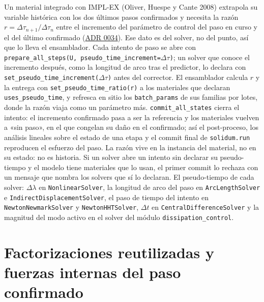 \documentclass[11pt,oneside]{report}
\begin{document}
Un material integrado con IMPL-EX (Oliver, Huespe y Cante 2008) extrapola su variable histórica con los dos últimos pasos confirmados y necesita la razón $r = \Delta\tau_{n+1}/\Delta\tau_n$ entre el incremento del parámetro de control del paso en curso y el del último confirmado (\hyperref[adr:0034]{ADR 0034}). Ese dato es del solver, no del punto, así que lo lleva el ensamblador. Cada intento de paso se abre con \texttt{prepare\_\allowbreak{}all\_\allowbreak{}steps(U, pseudo\_\allowbreak{}time\_\allowbreak{}increment=\ensuremath{\Delta}\ensuremath{\tau})}; un solver que conoce el incremento después, como la longitud de arco tras el predictor, lo declara con \texttt{set\_\allowbreak{}pseudo\_\allowbreak{}time\_\allowbreak{}increment(\ensuremath{\Delta}\ensuremath{\tau})} antes del corrector. El ensamblador calcula $r$ y la entrega con \texttt{set\_\allowbreak{}pseudo\_\allowbreak{}time\_\allowbreak{}ratio(r)} a los materiales que declaran \texttt{uses\_pseudo\_time}, y refresca en sitio los \texttt{batch\_params} de sus familias por lotes, donde la razón viaja como un parámetro más. \texttt{commit\_\allowbreak{}all\_\allowbreak{}states} cierra el intento: el incremento confirmado pasa a ser la referencia y los materiales vuelven a «sin paso», en el que congelan su daño en el confirmado; así el post-proceso, los análisis lineales sobre el estado de una etapa y el commit final de \texttt{solidum.run} reproducen el esfuerzo del paso. La razón vive en la instancia del material, no en su estado: no es historia. Si un solver abre un intento sin declarar su pseudo-tiempo y el modelo tiene materiales que lo usan, el primer commit lo rechaza con un mensaje que nombra los solvers que sí lo declaran. El pseudo-tiempo de cada solver: $\Delta\lambda$ en \texttt{NonlinearSolver}, la longitud de arco del paso en \texttt{ArcLengthSolver} e \texttt{IndirectDisplacementSolver}, el paso de tiempo del intento en \texttt{NewtonNewmarkSolver} y \texttt{NewtonHHTSolver}, $\Delta t$ en \texttt{CentralDifferenceSolver} y la magnitud del modo activo en el solver del módulo \texttt{dissipation\_\allowbreak{}control}.

\section{Factorizaciones reutilizadas y fuerzas internas del paso confirmado}
\end{document}
